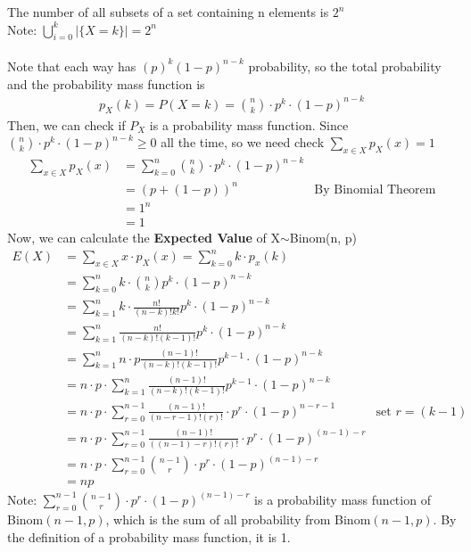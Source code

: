 \documentclass[11pt,oneside]{book}
\theoremstyle{break}
\theoremstyle{break}
\newcommand{\note}{\color{Purple}Note: \color{black}}
\begin{document}
The number of all subsets of a set containing n elements is $2^n$\\
\note $\bigcup_{i=0}^{k}|\{X=k\}|=2^n$\\
\hfill\\
Note that each way has $(p)^{k}(1-p)^{n-k}$ probability, so the total probability and the probability mass function is \begin{align*}
p_X(k)=P(X=k)=\binom nk \cdot p^k\cdot (1-p)^{n-k}
\end{align*} 
Then, we can check if $P_X$ is a probability mass function. Since $\binom nk \cdot p^k\cdot (1-p)^{n-k}\geq 0$ all the time, so we need check $\sum_{x\in X}p_X(x)=1$\begin{align*}
\sum_{x\in X}p_X(x)&=\sum_{k=0}^{n}\binom nk \cdot p^k\cdot (1-p)^{n-k}\\
&=(p+(1-p))^n&\text{By Binomial Theorem}\\
&=1^n\\
&=1
\end{align*} 
Now, we can calculate the \textbf{Expected Value} of X$\sim$Binom(n, p)
\begin{align*}
E(X)&=\sum_{x\in X}x\cdot p_X(x)=\sum_{k=0}^{n}k\cdot p_x(k)\\
&=\sum_{k=0}^{n}k\cdot \binom nk p^k\cdot (1-p)^{n-k}\\
&=\sum_{k=1}^{n}k\cdot \frac{n!}{(n-k)!k!} p^k\cdot (1-p)^{n-k}\\
&=\sum_{k=1}^{n}\frac{n!}{(n-k)!(k-1)!} p^k\cdot (1-p)^{n-k}\\
&=\sum_{k=1}^{n}n\cdot p \frac{(n-1)!}{(n-k)!(k-1)!} p^{k-1}\cdot (1-p)^{n-k}\\
&=n\cdot p \cdot \sum_{k=1}^{n}\frac{(n-1)!}{(n-k)!(k-1)!} p^{k-1}\cdot (1-p)^{n-k}\\
&=n\cdot p \cdot \sum_{r=0}^{n-1}\frac{(n-1)!}{(n-r-1)!(r)!} \cdot p^{r}\cdot (1-p)^{n-r-1} &\text{set }r=(k-1)\\
&=n\cdot p \cdot \sum_{r=0}^{n-1}\frac{(n-1)!}{((n-1)-r)!(r)!} \cdot p^{r}\cdot (1-p)^{(n-1)-r} \\
&=n\cdot p \cdot \sum_{r=0}^{n-1}\binom{n-1}{r}  \cdot p^{r}\cdot (1-p)^{(n-1)-r} \\
&=n p 
\end{align*}
\note $\sum_{r=0}^{n-1}\binom{n-1}{r}  \cdot p^{r}\cdot (1-p)^{(n-1)-r}$ is a probability mass function of Binom$(n-1,p)$, which is the sum of all probability from Binom$(n-1,p)$. By the definition of a probability mass function, it is 1.\\
\hfill\\
\end{document}
